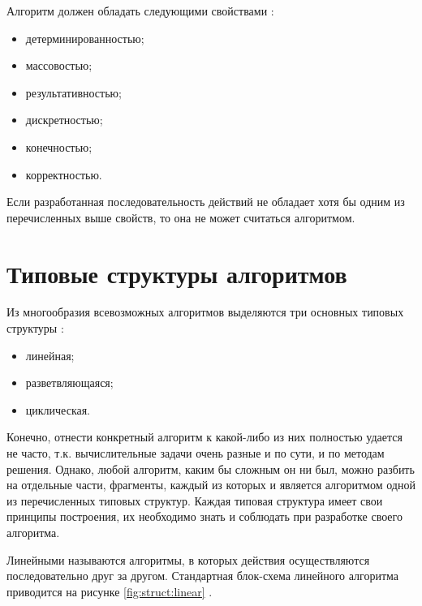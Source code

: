 Алгоритм должен обладать следующими свойствами \cite{comp:algoritm}:

\begin{itemize}
    \item детерминированностью;
    \item массовостью;
    \item результативностью;
    \item дискретностью;
    \item конечностью;
    \item корректностью.
\end{itemize}

Если разработанная последовательность действий не обладает хотя бы одним из перечисленных выше свойств, то она не может считаться алгоритмом.

\section{Типовые структуры алгоритмов}

Из многообразия всевозможных алгоритмов выделяются три основных типовых структуры \cite{comp:algoritm}:

\begin{itemize}
    \item линейная;
    \item разветвляющаяся;
    \item циклическая.
\end{itemize}

Конечно, отнести конкретный алгоритм к какой-либо из них полностью удается не часто, т.к. вычислительные задачи очень разные и по сути, и по методам решения. Однако, любой алгоритм, каким бы сложным он ни был, можно разбить на отдельные части, фрагменты, каждый из которых и является алгоритмом одной из перечисленных типовых структур. Каждая типовая структура имеет свои принципы построения, их необходимо знать и соблюдать при разработке своего алгоритма.

Линейными называются алгоритмы, в которых действия осуществляются последовательно друг за другом. Стандартная блок-схема линейного алгоритма приводится на рисунке \ref{fig:struct:linear} \cite{szci:struct}.

